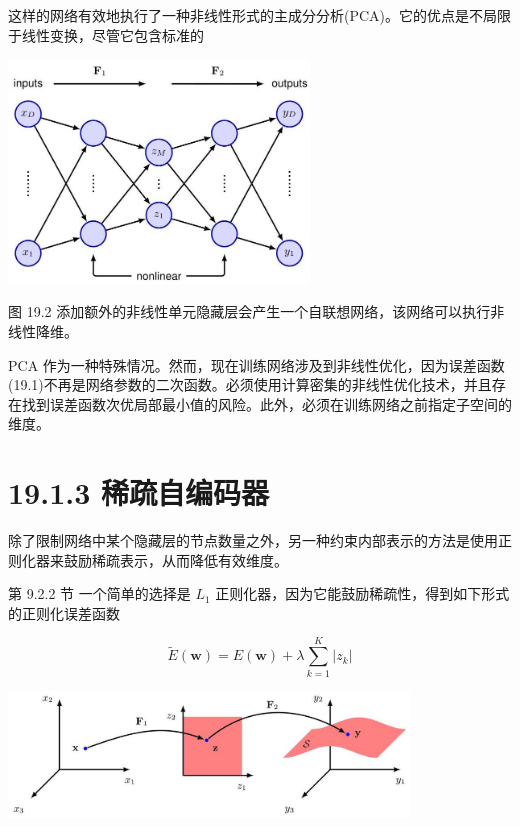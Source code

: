 \documentclass[10pt]{article}
\begin{document}
这样的网络有效地执行了一种非线性形式的主成分分析(PCA)。它的优点是不局限于线性变换，尽管它包含标准的

\begin{center}
\includegraphics[max width=0.6\textwidth]{images/0194e279-9b28-703a-88f4-c3ac21e2010d_585_792_349_750_557_0.jpg}
\end{center}
\hspace*{3em} 

图 19.2 添加额外的非线性单元隐藏层会产生一个自联想网络，该网络可以执行非线性降维。

PCA 作为一种特殊情况。然而，现在训练网络涉及到非线性优化，因为误差函数(19.1)不再是网络参数的二次函数。必须使用计算密集的非线性优化技术，并且存在找到误差函数次优局部最小值的风险。此外，必须在训练网络之前指定子空间的维度。

\section*{19.1.3 稀疏自编码器}

除了限制网络中某个隐藏层的节点数量之外，另一种约束内部表示的方法是使用正则化器来鼓励稀疏表示，从而降低有效维度。

第 9.2.2 节 一个简单的选择是 \({L}_{1}\) 正则化器，因为它能鼓励稀疏性，得到如下形式的正则化误差函数

\[
\widetilde{E}\left( \mathbf{w}\right)  = E\left( \mathbf{w}\right)  + \lambda \mathop{\sum }\limits_{{k = 1}}^{K}\left| {z}_{k}\right|  \tag{19.2}
\]

\begin{center}
\includegraphics[max width=0.8\textwidth]{images/0194e279-9b28-703a-88f4-c3ac21e2010d_585_415_1466_1085_343_0.jpg}
\end{center}
\hspace*{3em} 
\end{document}
